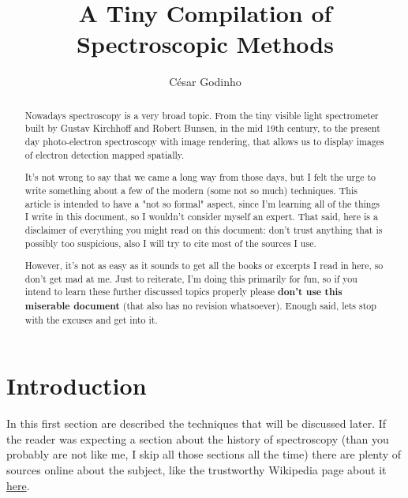 \documentclass[]{article}
\begin{document}
\title{A Tiny Compilation of Spectroscopic Methods}
\author{César Godinho}
\maketitle

\newpage

\begin{abstract}
Nowadays spectroscopy is a very broad topic. From the tiny visible light spectrometer built by Gustav Kirchhoff and Robert Bunsen, in the mid 19th century, to the present day photo-electron spectroscopy with image rendering, that allows us to display images of electron detection mapped spatially.
\par It's not wrong to say that we came a long way from those days, but I felt the urge to write something about a few of the modern (some not so much) techniques. This article is intended to have a "not so formal" aspect, since I'm learning all of the things I write in this document, so I wouldn't consider myself an expert. That said, here is a disclaimer of everything you might read on this document: don't trust anything that is possibly too suspicious, also I will try to cite most of the sources I use. \par However, it's not as easy as it sounds to get all the books or excerpts I read in here, so don't get mad at me. Just to reiterate, I'm doing this primarily for fun, so if you intend to learn these further discussed topics properly please \textbf{don't use this miserable document} (that also has no revision whatsoever). Enough said, lets stop with the excuses and get into it.
\end{abstract}

\newpage

\section{Introduction}
In this first section are described the techniques that will be discussed later. If the reader was expecting a section about the history of spectroscopy (than you probably are not like me, I skip all those sections all the time) there are plenty of sources online about the subject, like the trustworthy Wikipedia page about it \href{https://en.wikipedia.org/wiki/History_of_spectroscopy}{here}.
\end{document}
